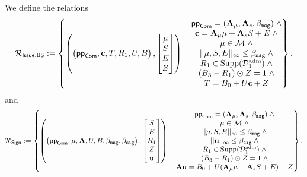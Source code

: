 We define the relations
\[
\mathcal{R}_{\mathsf{Issue,BS}}:=\left\{ \left(
\begin{pmatrix}
\mathsf{pp}_{\mathsf{Com}},\mathbf{c},T,R_1,U,B
\end{pmatrix},
\begin{bmatrix}
\mathbf{\mu}\\ S\\ E\\ Z
\end{bmatrix}\right)
~\bigg |~
\begin{matrix}
\mathsf{pp}_{\mathsf{Com}}=(\mathbf{A}_\mu,\mathbf{A}_s,\beta_{\mathtt{msg}}) \;\land\\
\mathbf{c} = \mathbf{A}_\mu\mathbf{\mu} + \mathbf{A}_s S + E \;\land\\
\mathbf{\mu} \in \mathcal M \;\land\\
||\mathbf{\mu},S,E||_{\infty} \leq \beta_{\mathtt{msg}} \;\land\\
R_1\in\mathrm{Supp}(\mathcal D_1^{\mathrm{adm}}) \;\land\\
(B_3-R_1)\odot Z = 1 \;\land\\
T = B_0 + U\mathbf{c} + Z
\end{matrix}
\right\}.
\]
and
\[
\mathcal{R}_{\mathsf{Sign}} :=\left\{ \left(
\begin{pmatrix}
\mathsf{pp}_{\mathsf{Com}},\mathbf{\mu},\mathbf{A},U,B,\beta_{\mathtt{msg}},\beta_{\mathtt{sig}}
\end{pmatrix},
\begin{bmatrix}
S\\ E\\ R_1\\ Z\\ \mathbf{u}
\end{bmatrix}\right)
~\bigg |~
\begin{matrix}
\mathsf{pp}_{\mathsf{Com}}=(\mathbf{A}_\mu,\mathbf{A}_s,\beta_{\mathtt{msg}}) \;\land\\
\mathbf{\mu} \in \mathcal M \;\land\\
||\mathbf{\mu},S,E||_{\infty} \leq \beta_{\mathtt{msg}} \;\land\\
||\mathbf{u}||_\infty \leq \beta_{\mathtt{sig}} \;\land\\
R_1\in\mathrm{Supp}(\mathcal D_1^{\mathrm{adm}}) \;\land\\
(B_3-R_1)\odot Z = 1 \;\land\\
\mathbf{A} \mathbf{u} = B_0 + U(\mathbf{A}_\mu\mathbf{\mu} + \mathbf{A}_s S + E) + Z
\end{matrix}
\right\}.
\]

